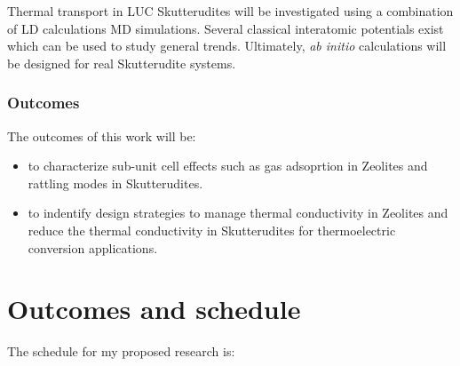 \documentclass[letterpaper,12pt]{article}
\begin{document}
Thermal transport in LUC Skutterudites will be investigated using a combination of LD calculations MD simulations. Several classical interatomic potentials exist which can be used to study general trends.\cite{PhysRevB.82.195207,PhysRevB.81.134301} Ultimately, \emph{ab initio} calculations will be designed for real Skutterudite systems.

\subsubsection{\label{S:Resarch-Objectives-2-outcomes}Outcomes}

The outcomes of this work will be:

\begin{itemize}
\item to characterize sub-unit cell effects such as gas adsoprtion in Zeolites and rattling modes in Skutterudites.

\item to indentify design strategies to manage thermal conductivity in Zeolites and reduce the thermal conductivity in Skutterudites for thermoelectric conversion applications.
\end{itemize}

\clearpage


\section{\label{S-schedule}Outcomes and schedule}
%
%
%
%
%
%
%
%

The schedule for my proposed research is:
\end{document}
